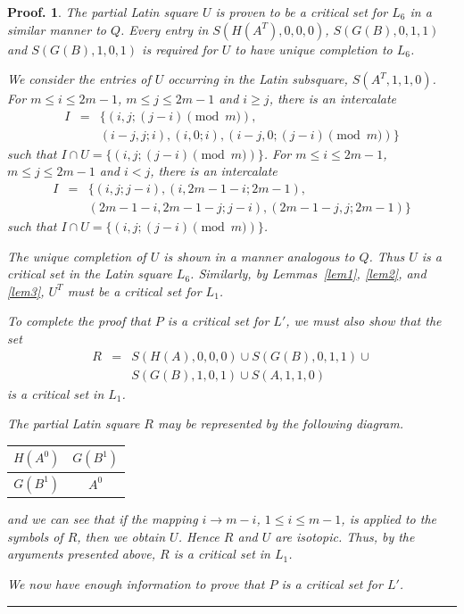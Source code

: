 \documentclass[12pt]{report}
\newtheorem{preproof}{{\bf Proof.}}
\newenvironment{proof}[1]{\begin{preproof}{\rm
               #1}\hfill{\rule[-0.5mm]{2mm}{2mm}}}{\end{preproof}}
\begin{document}
\begin{proof}
{The partial Latin square $U$ is proven to be a critical set for $L_6$
in a similar manner to $Q$.  Every entry in $S(H(A^T),0,0,0)$,
$S(G(B),0,1,1)$ and $S(G(B),1,0,1)$ is required for $U$ to have unique
completion to $L_6$.

We consider the entries of $U$ occurring in the Latin subsquare,
$S(A^T,1,1,0)$.  For $m \leq i \leq 2m-1$, $m \leq j \leq 2m -1$ and $i
\geq j$, there is an intercalate 
\begin{eqnarray*}
I &=& \{ (i, j; (j-i) \pmod{m}), \\
&& (i-j, j; i), (i, 0; i), (i-j, 0; (j-i) \pmod{m}) \}
\end{eqnarray*}
such that $I
\cap U = \{ (i, j; (j-i) \pmod{m}) \}$.  For $m \leq i \leq 2m-1$, $m \leq j \leq
2m-1$ and $i < j$, there is an intercalate
\begin{eqnarray*}
I &=& \{ (i, j; j-i), (i, 2m-1-i; 2m-1), \\
&& (2m-1-i, 2m-1-j; j-i), (2m-1-j, j; 2m-1) \}
\end{eqnarray*}
such that
$I \cap U = \{ (i, j; (j-i) \pmod{m}) \}$.  

The unique completion of $U$ is shown in a manner analogous to $Q$.
Thus $U$ is a critical set in the Latin square $L_6$.
Similarly, by Lemmas~\ref{lem1}, \ref{lem2}, and \ref{lem3}, $U^T$ must
be a critical set for $L_1$.

To complete the proof that $P$ is a critical set for $L'$, we must
also show that the set 
\begin{eqnarray*}
R &=& S(H(A),0,0,0) \cup S(G(B),0,1,1) \cup \\
&& S(G(B),1,0,1) \cup S(A,1,1,0)
\end{eqnarray*}
is a critical set in $L_1$.

The partial Latin square $R$ may be represented by the following diagram.
\begin{center}
\begin{tabular}{|c|c|}
\hline
$H(A^0)$ & $G(B^1)$ \\
\hline
$G(B^1)$ & $A^0$ \\
\hline
\end{tabular}
\end{center}
and we can see that if the mapping $i \rightarrow m-i$, $1 \leq i \leq m-1$,
is applied to the symbols of $R$, then we obtain $U$.  Hence $R$ and $U$
are isotopic.  Thus, by the arguments presented above, $R$ is a critical
set in $L_1$.

We now have enough information to prove that $P$ is a critical set for $L'$.

}
\end{proof}
\end{document}

